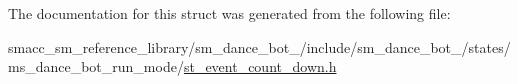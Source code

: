 The documentation for this struct was generated from the following file\+:\begin{DoxyCompactItemize}
\item 
smacc\+\_\+sm\+\_\+reference\+\_\+library/sm\+\_\+dance\+\_\+bot\+\_/include/sm\+\_\+dance\+\_\+bot\+\_/states/ms\+\_\+dance\+\_\+bot\+\_\+run\+\_\+mode/\hyperlink{2_2include_2sm__dance__bot__2_2states_2ms__dance__bot__run__mode_2st__event__count__down_8h}{st\+\_\+event\+\_\+count\+\_\+down.\+h}\end{DoxyCompactItemize}
